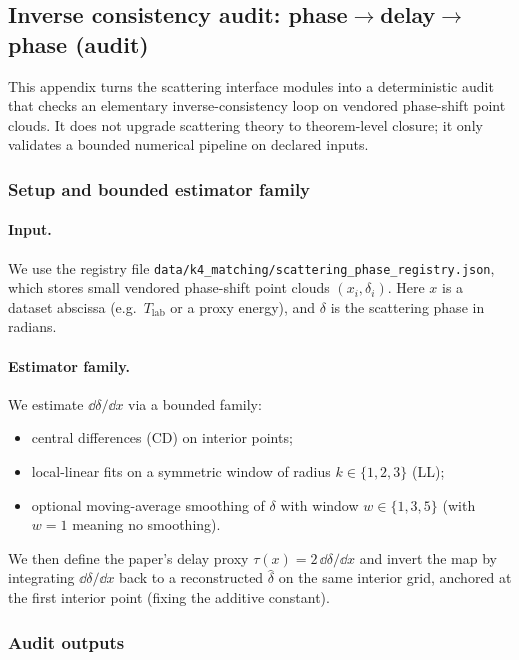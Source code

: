 \subsection{Inverse consistency audit: phase$\to$delay$\to$phase (audit)}
\label{app:scattering_inverse_consistency_audit}

This appendix turns the scattering interface modules into a deterministic audit that checks an elementary inverse-consistency loop on vendored phase-shift point clouds.
It does not upgrade scattering theory to theorem-level closure; it only validates a bounded numerical pipeline on declared inputs.

\subsubsection{Setup and bounded estimator family}
\paragraph{Input.}
\AuditTag We use the registry file \texttt{data/k4\_matching/scattering\_phase\_registry.json}, which stores small vendored phase-shift point clouds $(x_i,\delta_i)$.
Here $x$ is a dataset abscissa (e.g.\ $T_{\mathrm{lab}}$ or a proxy energy), and $\delta$ is the scattering phase in radians.

\paragraph{Estimator family.}
\AuditTag We estimate $\dd\delta/\dd x$ via a bounded family:
\begin{itemize}
\item central differences (CD) on interior points;
\item local-linear fits on a symmetric window of radius $k\in\{1,2,3\}$ (LL);
\item optional moving-average smoothing of $\delta$ with window $w\in\{1,3,5\}$ (with $w=1$ meaning no smoothing).
\end{itemize}
We then define the paper's delay proxy $\tau(x)=2\,\dd\delta/\dd x$ and invert the map by integrating $\dd\delta/\dd x$ back to a reconstructed $\widehat\delta$ on the same interior grid, anchored at the first interior point (fixing the additive constant).

\subsubsection{Audit outputs}
\AuditTag %

